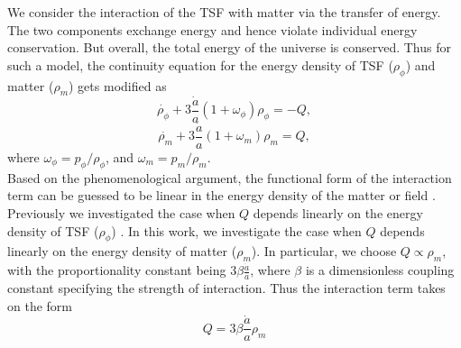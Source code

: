 \documentclass[preprint,aps,floatfix]{revtex4}
\begin{document}
    We consider the interaction of the TSF with matter via the transfer of energy. The two components exchange energy and hence violate individual energy conservation. But overall, the total energy of the universe is conserved. Thus for such a model, the continuity equation for the energy density of TSF ($\rho_\phi$) and matter ($\rho_m$) gets modified as %
    \begin{equation}
        \dot{\rho_\phi} + 3\frac{\dot{a}}{a}(1 + \omega_\phi)\rho_\phi = -Q,
    \end{equation}
    \begin{equation}
        \dot{\rho_m} + 3\frac{\dot{a}}{a}(1 + \omega_m)\rho_m =Q,
    \end{equation}
    where $\omega_\phi = p_\phi/\rho_\phi$, and $\omega_m = p_m/\rho_m$.\\
    Based on the phenomenological argument, the functional form of the interaction term can be guessed to be linear in the energy density of the matter or field \cite{Pav_n_2008,DeArcia:2022nps}. Previously we investigated the case when $Q$ depends linearly on the energy density of TSF ($\rho_\phi$) \cite{kundu2021interacting}. In this work, we investigate the case when $Q$ depends linearly on the energy density of matter ($\rho_m$). In particular, we choose $Q \propto \rho_m$, with the proportionality constant being $3\displaystyle\beta\frac{\dot{a}}{a}$, where $\beta$ is a dimensionless coupling constant specifying the strength of interaction. Thus the interaction term takes on the form
    \begin{equation}
        Q = 3\beta \frac{\dot{a}}{a} \rho_m
    \end{equation}

\end{document}
